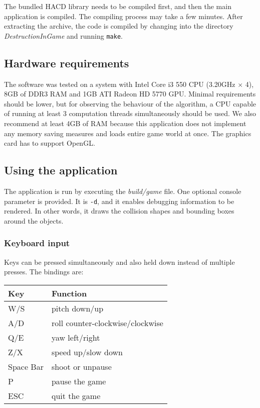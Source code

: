 The bundled HACD library needs to be compiled first, and then the main application is compiled. The compiling process may take a few minutes. After extracting the archive, the code is compiled by changing into the directory \emph{DestructionInGame} and running \texttt{make}.

\subsection*{Hardware requirements}
The software was tested on a system with Intel Core i3 550 CPU (3.20GHz $\times$ 4), 8GB of DDR3 RAM and 1GB ATI Radeon HD 5770 GPU. Minimal requirements should be lower, but for observing the behaviour of the algorithm, a CPU capable of running at least 3 computation threads simultaneously should be used. We also recommend at least 4GB of RAM because this application does not implement any memory saving measures and loads entire game world at once. The graphics card has to support OpenGL.

\subsection*{Using the application}
The application is run by executing the \emph{build/game} file. One optional console parameter is provided. It is {\tt -d}, and it enables debugging information to be rendered. In other words, it draws the collision shapes and bounding boxes around the objects.
\subsubsection*{Keyboard input}
Keys can be pressed simultaneously and also held down instead of multiple presses. The bindings are:

\begin{centering}
  \begin{tabular}{ll}
  Key & Function \\
  \hline
  W/S & pitch down/up \\
  A/D & roll counter-clockwise/clockwise \\
  Q/E & yaw left/right \\
  Z/X & speed up/slow down \\
  Space Bar & shoot or unpause \\ 
  P & pause the game \\
  ESC & quit the game \\
  \end{tabular}
\end{centering}

